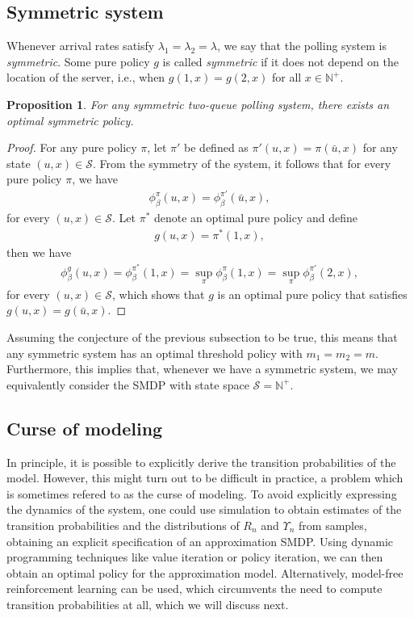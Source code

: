 \documentclass{article}
\theoremstyle{definition}
\theoremstyle{plain}
\newtheorem{proposition}{Proposition}[section]
\begin{document}
\subsection{Symmetric system}
\label{sec:symmetric_system}

Whenever arrival rates satisfy $\lambda_{1} = \lambda_{2} = \lambda$, we say that the polling
system is \textit{symmetric}. Some pure policy $g$ is called \textit{symmetric} if it
does not depend on the location of the server, i.e., when $g(1,x) = g(2,x)$ for
all $x \in \mathbb{N}^{+}$.

\begin{proposition}
  For any symmetric two-queue polling system, there exists an optimal symmetric
  policy.
\end{proposition}
\begin{proof}
For any pure policy $\pi$, let $\pi'$ be defined as
$\pi'(u, x) = \pi(\bar{u}, x)$ for any state $(u, x) \in \mathcal{S}$. From the
symmetry of the system, it follows that for every pure policy $\pi$, we have
\begin{align}
  \phi_{\beta}^{\pi}(u, x) = \phi_{\beta}^{\pi'}(\bar{u}, x) ,
\end{align}
for every $(u, x) \in \mathcal{S}$. Let $\pi^{*}$ denote an optimal pure policy
and define
\begin{align}
g(u, x) = \pi^{*}(1, x) ,
\end{align}
then we have
\begin{align}
  \phi_{\beta}^{g}(u, x) = \phi_{\beta}^{\pi^{*}}(1, x) = \sup_{\pi} \phi_{\beta}^{\pi} (1, x) = \sup_{\pi} \phi_{\beta}^{\pi'} (2, x) ,
\end{align}
for every $(u, x) \in \mathcal{S}$, which shows that $g$ is an optimal pure
policy that satisfies $g(u, x) = g(\bar{u}, x)$.
\end{proof}

Assuming the conjecture of the previous subsection to be true, this means that
any symmetric system has an optimal threshold policy with $m_{1} = m_{2} = m$.
Furthermore, this implies that, whenever we have a symmetric system, we may
equivalently consider the SMDP with state space $\mathcal{S} = \mathbb{N}^{+}$.


\subsection{Curse of modeling}

In principle, it is possible to explicitly derive the transition probabilities
of the model. However, this might turn out to be difficult in practice, a
problem which is sometimes refered to as the curse of modeling. To avoid
explicitly expressing the dynamics of the system, one could use simulation to
obtain estimates of the transition probabilities and the distributions of
$R_{n}$ and $\Upsilon_{n}$ from samples, obtaining an explicit specification of
an approximation SMDP. Using dynamic programming techniques like value iteration
or policy iteration, we can then obtain an optimal policy for the approximation
model.
%
Alternatively, model-free reinforcement learning can be used, which circumvents
the need to compute transition probabilities at all, which we will discuss next.
\end{document}
